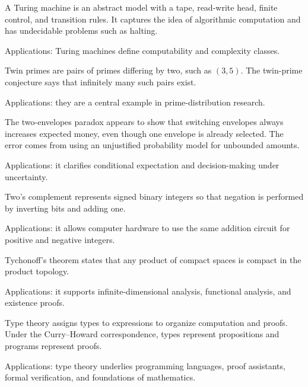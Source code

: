 A Turing machine is an abstract model with a tape, read-write head, finite control, and transition rules. It captures the idea of algorithmic computation and has undecidable problems such as halting. \par\noindent Applications: Turing machines define computability and complexity classes.

Twin primes are pairs of primes differing by two, such as $(3,5)$. The twin-prime conjecture says that infinitely many such pairs exist. \par\noindent Applications: they are a central example in prime-distribution research.

The two-envelopes paradox appears to show that switching envelopes always increases expected money, even though one envelope is already selected. The error comes from using an unjustified probability model for unbounded amounts. \par\noindent Applications: it clarifies conditional expectation and decision-making under uncertainty.

Two's complement represents signed binary integers so that negation is performed by inverting bits and adding one. \par\noindent Applications: it allows computer hardware to use the same addition circuit for positive and negative integers.

Tychonoff's theorem states that any product of compact spaces is compact in the product topology. \par\noindent Applications: it supports infinite-dimensional analysis, functional analysis, and existence proofs.

Type theory assigns types to expressions to organize computation and proofs. Under the Curry--Howard correspondence, types represent propositions and programs represent proofs. \par\noindent Applications: type theory underlies programming languages, proof assistants, formal verification, and foundations of mathematics.
